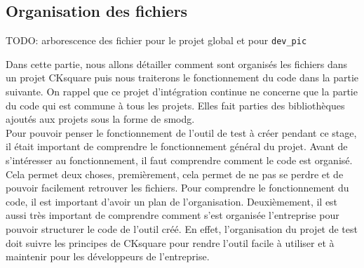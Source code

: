 \documentclass[a4paper]{article}
\begin{document}
\subsection{Organisation des fichiers}
\label{orgaprojck}

TODO: arborescence des fichier pour le projet global et pour \verb|dev_pic|

Dans cette partie, nous allons détailler comment sont organisés les fichiers
dans un projet CKsquare puis nous traiterons le fonctionnement du code dans la
partie suivante. On rappel que ce projet d'intégration continue ne concerne que
la partie du code qui est commune à tous les projets. Elles fait parties des
bibliothèques ajoutés aux projets sous la forme de \gls{smodg}. \\

Pour pouvoir penser le fonctionnement de l'outil de test à créer pendant ce
stage, il était important de comprendre le fonctionnement général du projet.
Avant de s'intéresser au fonctionnement, il faut comprendre comment le code est
organisé. Cela permet deux choses, premièrement, cela permet de ne pas se perdre
et de pouvoir facilement retrouver les fichiers. Pour comprendre le
fonctionnement du code, il est important d'avoir un plan de l'organisation.
Deuxièmement, il est aussi très important de comprendre comment s'est organisée
l'entreprise pour pouvoir structurer le code de l'outil créé. En
effet, l'organisation du projet de test doit suivre les principes de CKsquare
pour rendre l'outil facile à utiliser et à maintenir pour les développeurs de
l'entreprise.

\end{document}
